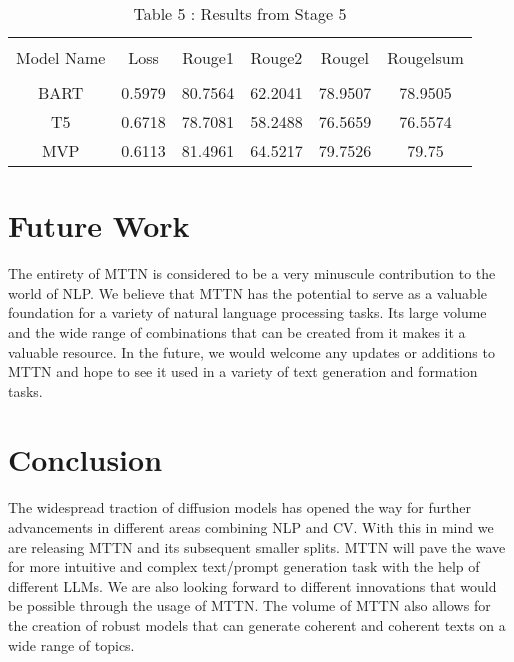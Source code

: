 \documentclass{article}
\begin{document}
\begin{center}
\begin{table}[h!]
\vspace{0.4cm} 
\hspace*{3cm}\begin{tabular}{c c c c c c} 
\\
\hline \\[1ex]  
 Model Name    & Loss     & Rouge1   & Rouge2 & Rougel & Rougelsum \\ [1ex] 
 \hline \\[0.2ex]
 BART & 0.5979 & 80.7564 & 62.2041 & 78.9507 & 78.9505\\ 
 [1ex] 

 T5 & 0.6718 & 78.7081 & 58.2488 & 76.5659 & 76.5574\\
 [1ex] 

 MVP & 0.6113 & 81.4961 & 64.5217 & 79.7526 & 79.75 \\
 [1ex] 
 \hline
\end{tabular}
\caption{Table 5 : Results from Stage 5}
 \end{table}
\end{center}

\newpage

\section{Future Work}

The entirety of MTTN is considered to be a very minuscule contribution to the world of NLP. We believe that MTTN has the potential to serve as a valuable foundation for a variety of natural language processing tasks. Its large volume and the wide range of combinations that can be created from it makes it a valuable resource. In the future, we would welcome any updates or additions to MTTN and hope to see it used in a variety of text generation and formation tasks.

\section{Conclusion}
The widespread traction of diffusion models\cite{DBLP:journals/corr/abs-2006-11239}\cite{DBLP:journals/corr/Sohl-DicksteinW15}\cite{DBLP:journals/corr/abs-1907-05600} has opened the way for further advancements in different areas combining NLP and CV. With this in mind we are releasing MTTN and its subsequent smaller splits. MTTN will pave the wave for more intuitive and complex text/prompt generation task with the help of different LLMs. We are also looking forward to different innovations that would be possible through the usage of MTTN. The volume of MTTN also allows for the creation of robust models that can generate coherent and coherent texts on a wide range of topics.
\end{document}
